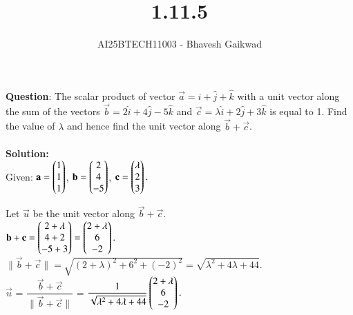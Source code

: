 \documentclass[journal]{IEEEtran}
\begin{document}

\vspace{3cm}

\title{1.11.5}
\author{AI25BTECH11003 - Bhavesh Gaikwad}
{\let\newpage\relax\maketitle}

\renewcommand{\thefigure}{\theenumi}
\renewcommand{\thetable}{\theenumi}
\setlength{\intextsep}{10pt} 


\renewcommand{\thetable}{\theenumi}


\textbf{Question}: The scalar product of vector $\overrightarrow{a} = \hat{i} + \hat{j} + \hat{k}$ with a unit vector along the sum of the vectors $\overrightarrow{b} =2\hat{i} + 4\hat{j} - 5\hat{k}$ and $\overrightarrow{c} = \lambda\hat{i} + 2\hat{j} + 3\hat{k}$ is equal to 1. Find the value of $\lambda$ and hence find the unit vector along $\overrightarrow{b} + \overrightarrow{c}$. \\\\

\textbf{Solution:}\\

 Given: $\vec{a}=\myvec{1\\1\\1}$,  $\vec{b}=\myvec{2\\4\\-5}$,  $\vec{c}=\myvec{\lambda\\2\\3}.$

Let $\vec{u}$ be the unit vector along $\vec{b} + \vec{c} .$ \\

$ \vec{b} + \vec{c} = \myvec{2+\lambda\\4+2\\-5+3}
=\myvec{2+\lambda\\6\\-2}.$ \\

$\|\vec{b}+\vec{c}\| = \sqrt{(2+\lambda)^2+6^2+(-2)^2}
 = \sqrt{\lambda^2+4\lambda+44}.$ \\

$\vec{u}$ = $\dfrac{\vec{b} + \vec{c}}{\|\vec{b}+\vec{c}\|}$ = $\dfrac{1}{\sqrt{\lambda^2+4\lambda+44}} \myvec{2+\lambda\\6\\-2}.$ \\\\
\end{document}
